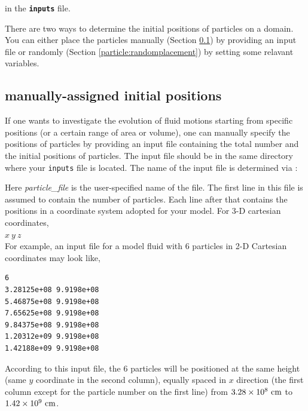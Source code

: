 \noindent in the {\tt {\bf inputs}} file.

\vspace{0.1in}
\noindent There are two ways to determine the initial positions of particles on a domain. You can either place the particles manually (Section \ref{particle:manualplacement}) by providing an input file or randomly (Section \ref{particle:randomplacement}) by setting some relavant variables.

\subsection{manually-assigned initial positions}
	\label{particle:manualplacement}
If one wants to investigate the evolution of fluid motions starting from specific positions (or a certain range of area or volume), one can manually specify the positions of particles by providing an input file containing the total number and the initial positions of particles.  
The input file should be in the same directory where your {\tt inputs} file is located. The name of the input file is  determined via :

\vspace{0.1in}
\vspace{0.1in}

\noindent Here {\em particle\_file} is the user-specified name of the file. The first line in this file is
assumed to contain the number of particles.  Each line after that contains the positions in a coordinate system adopted for your model. For 3-D cartesian coordinates, \\

$x ~y ~z$ \\

For example, an input file for a model fluid with 6 particles in 2-D Cartesian coordinates may look like,\\

\begin{lstlisting}
6
3.28125e+08 9.9198e+08 
5.46875e+08 9.9198e+08 
7.65625e+08 9.9198e+08 
9.84375e+08 9.9198e+08 
1.20312e+09 9.9198e+08 
1.42188e+09 9.9198e+08 
\end{lstlisting}

According to this input file, the 6 particles will be positioned at the same height (same $y$ coordinate in the second column), equally spaced in $x$ direction (the first column except for the particle number on the first line) from $3.28\times10^{8} {\rm ~cm}$ to $1.42\times 10^{9} {\rm ~cm}$.
	
